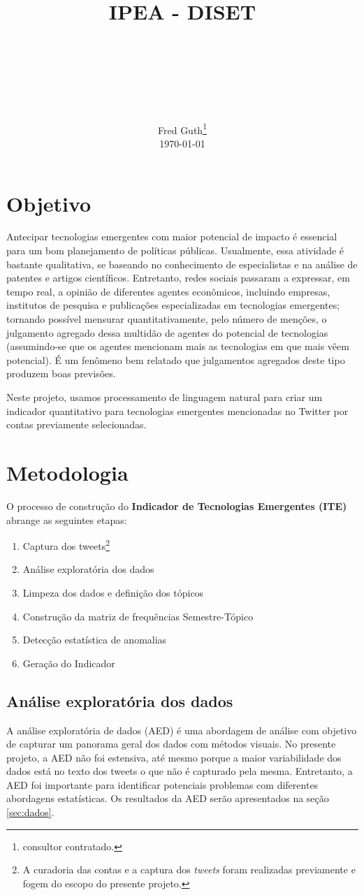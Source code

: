 \documentclass[paper=a4, fontsize=11pt]{scrartcl}
\title{
		\usefont{OT1}{bch}{b}{n}
		\normalfont \normalsize \textsc{IPEA - DISET} \\ [25pt]
		\horrule{0.5pt} \\[0.4cm]
		\huge \projectname \\
		\horrule{2pt} \\[0.5cm]
}
\author{
		\normalfont 								\normalsize
        Fred Guth\footnote{consultor contratado.}\\[-3pt]		\normalsize
        \today
}
\date{}
\numberwithin{equation}{section}		%
\numberwithin{figure}{section}			%
\numberwithin{table}{section}				%
\begin{document}
\maketitle
\thispagestyle{empty}
\section{Objetivo}
Antecipar tecnologias emergentes com maior potencial de impacto é essencial para um bom planejamento de políticas públicas.  Usualmente, essa atividade é bastante qualitativa, se baseando no conhecimento de especialistas e na análise de patentes e artigos científicos. Entretanto, redes sociais passaram a expressar, em tempo real, a opinião de diferentes agentes econômicos, incluindo empresas, institutos de pesquisa e publicações especializadas em tecnologias emergentes; tornando possível mensurar quantitativamente, pelo número de menções, o julgamento agregado dessa multidão de agentes  do potencial de tecnologias (assumindo-se que os agentes mencionam mais as tecnologias em que mais vêem potencial). É um fenômeno bem relatado \citep{surowiecki2004wisdom} que julgamentos agregados deste tipo produzem boas previsões.

Neste projeto, usamos processamento de linguagem natural para criar um indicador quantitativo para tecnologias emergentes mencionadas no Twitter por contas previamente selecionadas.

\section{Metodologia}
O processo de construção do \textbf{Indicador de Tecnologias Emergentes (ITE)} abrange as seguintes etapas:
\begin{enumerate}
	\item Captura dos tweets\footnote{A curadoria das contas e a captura dos \emph{tweets} foram realizadas previamente e fogem do escopo do presente projeto.}
	\item Análise exploratória dos dados
	\item Limpeza dos dados e definição dos tópicos
	\item Construção da matriz de frequências Semestre-Tópico
	\item Detecção estatística de anomalias
	\item Geração do Indicador
\end{enumerate}
\subsection{Análise exploratória dos dados}
A análise exploratória de dados (AED) é uma abordagem de análise com objetivo de capturar um panorama geral dos dados com métodos visuais. No presente projeto, a AED não foi estensiva, até mesmo porque a maior variabilidade dos dados está no texto dos tweets o que não é capturado pela mesma. Entretanto, a AED foi importante para identificar potenciais problemas com diferentes abordagens estatísticas. Os resultados da AED serão apresentados na seção \ref{sec:dados}.
\end{document}
